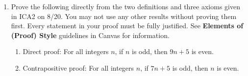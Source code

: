\documentclass[11pt]{article}
\begin{document}
  \begin{enumerate}
    \item 
    Prove the following directly from the two definitions and three axioms
    given in ICA2 on 8/20.
    You may not use any other results without proving them first.
    Every statement in your proof must be fully justified.
    See \textbf{Elements of (Proof) Style} guidelines in Canvas for information.
    \begin{enumerate}
    \item Direct proof: For all integers $n$, if $n$ is odd, then $9n + 5$ is even.


    \item Contrapositive proof: For all integers $n$, if $7n + 5$ is odd, then $n$ is even.\\


\end{enumerate}
\end{enumerate}
\end{document}
